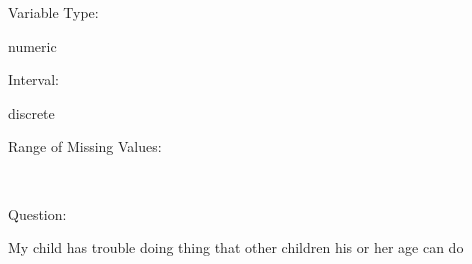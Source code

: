 \documentclass[
]{article}
\begin{document}
\begin{minipage}[t]{0.3\linewidth}

Variable Type:

\end{minipage}%
\begin{minipage}[t]{0.7\linewidth}

numeric

\end{minipage}

\begin{minipage}[t]{0.3\linewidth}

Interval:

\end{minipage}%
\begin{minipage}[t]{0.7\linewidth}

discrete

\end{minipage}

\begin{minipage}[t]{0.3\linewidth}

Range of Missing Values:

\end{minipage}%
\begin{minipage}[t]{0.7\linewidth}

~

\end{minipage}

\begin{minipage}[t]{0.3\linewidth}

Question:

\end{minipage}%
\begin{minipage}[t]{0.7\linewidth}

My child has trouble doing thing that other children his or her age can
do

\end{minipage}
\end{document}
